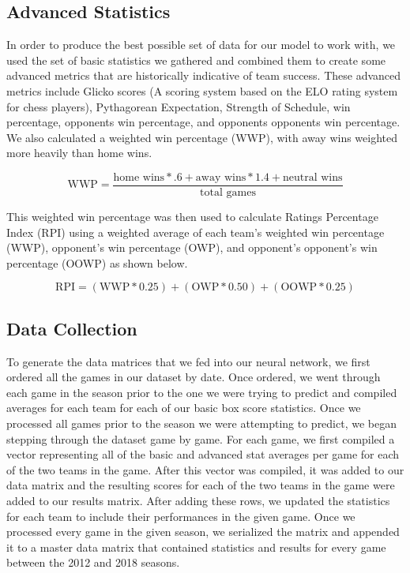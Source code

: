 \documentclass[10pt,twocolumn,letterpaper]{article}
\begin{document}
\subsection{Advanced Statistics}
In order to produce the best possible set of data for our model to work with, we used the set of basic statistics we gathered and combined them to create some advanced metrics that are historically indicative of team success.  These advanced metrics include Glicko scores (A scoring system based on the ELO rating system for chess players), Pythagorean Expectation, Strength of Schedule, win percentage, opponents win percentage, and opponents opponents win percentage.  We also calculated a weighted win percentage (WWP), with away wins weighted more heavily than home wins.
\begin{small}
$$\textrm{WWP} = \frac{\textrm{home wins}*.6 + \textrm{away wins}*1.4 + \textrm{neutral wins}}{\textrm{total games}}$$
\end{small}
This weighted win percentage was then used to calculate Ratings Percentage Index (RPI) using a weighted average of each team's weighted win percentage (WWP), opponent's win percentage (OWP), and opponent's opponent's win percentage (OOWP) as shown below.
\begin{small}
$$\textrm{RPI} = (\textrm{WWP} * 0.25) + (\textrm{OWP} * 0.50) + (\textrm{OOWP} * 0.25)$$
\end{small}
\subsection{Data Collection}
To generate the data matrices that we fed into our neural network, we first ordered all the games in our dataset by date.  Once ordered, we went through each game in the season prior to the one we were trying to predict and compiled averages for each team for each of our basic box score statistics.  Once we processed all games prior to the season we were attempting to predict, we began stepping through the dataset game by game.  For each game, we first compiled a vector representing all of the basic and advanced stat averages per game for each of the two teams in the game.  After this vector was compiled, it was added to our data matrix and the resulting scores for each of the two teams in the game were added to our results matrix.  After adding these rows, we updated the statistics for each team to include their performances in the given game.  Once we processed every game in the given season, we serialized the matrix and appended it to a master data matrix that contained statistics and results for every game between the 2012 and 2018 seasons.
\end{document}
